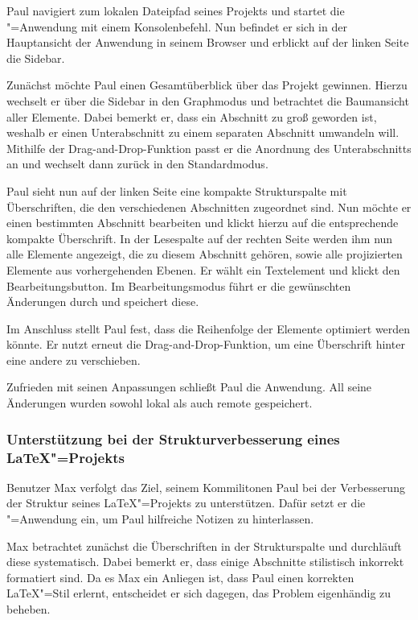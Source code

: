 Paul navigiert zum lokalen Dateipfad seines Projekts und startet die \texla"=Anwendung mit einem Konsolenbefehl.
Nun befindet er sich in der Hauptansicht der Anwendung in seinem Browser und erblickt auf der linken
Seite die Sidebar.

Zunächst möchte Paul einen Gesamtüberblick über das Projekt gewinnen.
Hierzu wechselt er über die Sidebar in den Graphmodus und betrachtet die Baumansicht aller Elemente.
Dabei bemerkt er, dass ein Abschnitt zu groß geworden ist, weshalb er einen Unterabschnitt zu einem separaten Abschnitt
umwandeln will.
Mithilfe der Drag-and-Drop-Funktion passt er die Anordnung des Unterabschnitts an und wechselt dann zurück in den
Standardmodus.

Paul sieht nun auf der linken Seite eine kompakte Strukturspalte
mit Überschriften, die den verschiedenen Abschnitten zugeordnet sind.
Nun möchte er einen bestimmten Abschnitt bearbeiten und klickt hierzu auf die entsprechende kompakte Überschrift.
In der Lesespalte auf der rechten Seite werden ihm nun alle Elemente angezeigt, die zu diesem Abschnitt
gehören, sowie alle projizierten Elemente aus vorhergehenden Ebenen.
Er wählt ein Textelement und klickt den Bearbeitungsbutton.
Im Bearbeitungsmodus führt er die gewünschten Änderungen durch und speichert diese.

Im Anschluss stellt Paul fest, dass die Reihenfolge der Elemente optimiert werden könnte.
Er nutzt erneut die Drag-and-Drop-Funktion, um eine Überschrift hinter eine andere zu verschieben.

Zufrieden mit seinen Anpassungen schließt Paul die Anwendung.
All seine Änderungen wurden sowohl lokal als auch remote gespeichert.

\subsubsection{Unterstützung bei der Strukturverbesserung eines \LaTeX"=Projekts}
Benutzer Max verfolgt das Ziel, seinem Kommilitonen Paul bei der Verbesserung der Struktur seines
\LaTeX"=Projekts zu unterstützen.
Dafür setzt er die \texla"=Anwendung ein, um Paul hilfreiche Notizen zu hinterlassen.

Max betrachtet zunächst die Überschriften in der Strukturspalte und durchläuft diese systematisch.
Dabei bemerkt er, dass einige Abschnitte stilistisch inkorrekt formatiert sind.
Da es Max ein Anliegen ist, dass Paul einen korrekten \LaTeX"=Stil erlernt, entscheidet
er sich dagegen, das Problem eigenhändig zu beheben.

